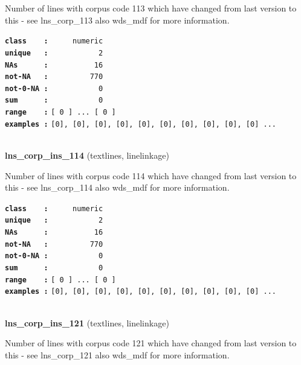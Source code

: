 \documentclass[]{article}
\begin{document}
Number of lines with corpus code 113 which have changed from last
version to this - see lns\_corp\_113 also wds\_mdf for more information.

\textbf{\texttt{class\ \ \ \ :}} \texttt{~~~~~numeric}\\
\textbf{\texttt{unique\ \ \ :}} \texttt{~~~~~~~~~~~2}\\
\textbf{\texttt{NAs\ \ \ \ \ \ :}} \texttt{~~~~~~~~~~16}\\
\textbf{\texttt{not-NA\ \ \ :}} \texttt{~~~~~~~~~770}\\
\textbf{\texttt{not-0-NA\ :}} \texttt{~~~~~~~~~~~0}\\
\textbf{\texttt{sum\ \ \ \ \ \ :}} \texttt{~~~~~~~~~~~0}\\
\textbf{\texttt{range\ \ \ \ :}}
\texttt{{[}\ 0\ {]}\ ...\ {[}\ 0\ {]}}\\
\textbf{\texttt{examples\ :}}
\texttt{{[}0{]},\ {[}0{]},\ {[}0{]},\ {[}0{]},\ {[}0{]},\ {[}0{]},\ {[}0{]},\ {[}0{]},\ {[}0{]},\ {[}0{]}\ ...}\\

~

\textbf{lns\_corp\_ins\_114} (textlines, linelinkage)

Number of lines with corpus code 114 which have changed from last
version to this - see lns\_corp\_114 also wds\_mdf for more information.

\textbf{\texttt{class\ \ \ \ :}} \texttt{~~~~~numeric}\\
\textbf{\texttt{unique\ \ \ :}} \texttt{~~~~~~~~~~~2}\\
\textbf{\texttt{NAs\ \ \ \ \ \ :}} \texttt{~~~~~~~~~~16}\\
\textbf{\texttt{not-NA\ \ \ :}} \texttt{~~~~~~~~~770}\\
\textbf{\texttt{not-0-NA\ :}} \texttt{~~~~~~~~~~~0}\\
\textbf{\texttt{sum\ \ \ \ \ \ :}} \texttt{~~~~~~~~~~~0}\\
\textbf{\texttt{range\ \ \ \ :}}
\texttt{{[}\ 0\ {]}\ ...\ {[}\ 0\ {]}}\\
\textbf{\texttt{examples\ :}}
\texttt{{[}0{]},\ {[}0{]},\ {[}0{]},\ {[}0{]},\ {[}0{]},\ {[}0{]},\ {[}0{]},\ {[}0{]},\ {[}0{]},\ {[}0{]}\ ...}\\

~

\textbf{lns\_corp\_ins\_121} (textlines, linelinkage)

Number of lines with corpus code 121 which have changed from last
version to this - see lns\_corp\_121 also wds\_mdf for more information.
\end{document}
